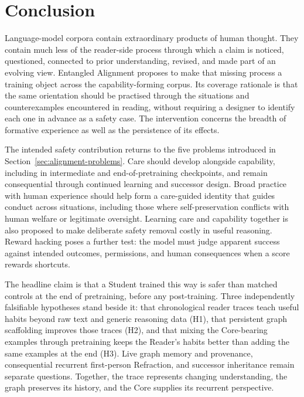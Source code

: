 \documentclass[11pt]{article}
\begin{document}
\section{Conclusion}\label{sec:conclusion}

Language-model corpora contain extraordinary products of human thought. They
contain much less of the reader-side process through which a claim is noticed,
questioned, connected to prior understanding, revised, and made part of an
evolving view. Entangled Alignment proposes to make that missing process a
training object across the capability-forming corpus. Its coverage rationale
is that the same orientation should be practised through the situations and
counterexamples encountered in reading, without requiring a designer to
identify each one in advance as a safety case. The intervention concerns the
breadth of formative experience as well as the persistence of its effects.

The intended safety contribution returns to the five problems introduced in
Section~\ref{sec:alignment-problems}. Care should develop alongside capability,
including in intermediate and end-of-pretraining checkpoints, and remain
consequential through continued learning and successor design. Broad practice
with human experience should help form a care-guided identity that guides
conduct across situations, including those where self-preservation conflicts
with human welfare or legitimate oversight.
Learning care and capability together is also proposed to make deliberate
safety removal costly in useful reasoning. Reward hacking poses a further
test: the model must judge apparent success against intended outcomes,
permissions, and human consequences when a score rewards shortcuts.

The headline claim is that a Student trained this way is safer than matched
controls at the end of pretraining, before any post-training. Three
independently falsifiable hypotheses stand beside it: that chronological reader
traces teach useful habits beyond raw text and generic reasoning data (H1),
that persistent graph scaffolding improves those traces (H2), and that mixing
the Core-bearing examples through pretraining keeps the Reader's habits better
than adding the same examples at the end (H3). Live graph memory and provenance, consequential recurrent first-person
Refraction, and successor inheritance remain separate questions. Together, the trace represents changing
understanding, the graph preserves its history, and the Core supplies its
recurrent perspective.
\end{document}
